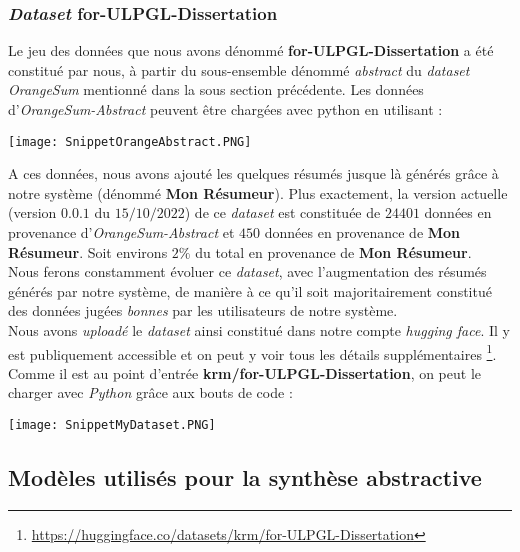 \subsubsection{\textit{Dataset} for-ULPGL-Dissertation}
Le jeu des données que nous avons dénommé \textbf{for-ULPGL-Dissertation} a été constitué par nous, à partir du sous-ensemble dénommé  \textit{abstract} du \textit{dataset} \textit{OrangeSum} mentionné dans la sous section précédente. Les données d'\textit{OrangeSum-Abstract} peuvent être chargées avec python en utilisant :
\begin{center}
\texttt{[image: SnippetOrangeAbstract.PNG]}
\end{center}
A ces données, nous avons ajouté les quelques résumés jusque là générés grâce à notre système (dénommé \textbf{Mon Résumeur}). Plus exactement, la version actuelle (version $ 0.0.1 $ du $ 15/10/2022 $) de ce \textit{dataset} est constituée de $ 24 401 $ données en provenance d'\textit{OrangeSum-Abstract} et $ 450 $ données en provenance de \textbf{Mon Résumeur}. Soit environs $ 2\% $ du total en provenance de \textbf{Mon Résumeur}.\\
Nous ferons constamment évoluer ce \textit{dataset}, avec l'augmentation des résumés générés par notre système, de manière à ce qu'il soit ma\-jo\-ri\-tai\-re\-ment constitué des données jugées \textit{bonnes} par les utilisateurs de notre système.\\
Nous avons \textit{uploadé} le \textit{dataset} ainsi constitué dans notre compte \textit{hugging face}. Il y est pu\-bli\-que\-ment accessible et on peut y voir tous les détails sup\-plé\-men\-tai\-res \footnote{\href{https://huggingface.co/datasets/krm/for-ULPGL-Dissertation}{https://huggingface.co/datasets/krm/for-ULPGL-Dissertation}}. Comme il est au point d'entrée \textbf{krm/for-ULPGL-Dissertation}, on peut le charger avec \textit{Python} grâce aux bouts de code :
\begin{center}
\texttt{[image: SnippetMyDataset.PNG]}
\end{center}

\subsection{Modèles utilisés pour la synthèse abstractive}
